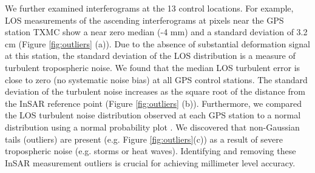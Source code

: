 \documentclass{utexasthesis}
\begin{document}
We further examined interferograms at the 13 control locations. For example, LOS measurements of the ascending interferograms at pixels near the GPS station TXMC show a near zero median (-4 mm) and a standard deviation of 3.2 cm (Figure \ref{fig:outliers} (a)). Due to the absence of substantial deformation signal at this station, the standard deviation of the LOS distribution is a measure of turbulent tropospheric noise.  We found that the median LOS turbulent error is close to zero (no systematic noise bias) at all GPS control stations. The standard deviation of the turbulent noise increases as the square root of the distance from the InSAR reference point (Figure \ref{fig:outliers} (b)). Furthermore, we compared the LOS turbulent noise distribution observed at each GPS station to a normal distribution using a normal probability plot \citep{Filliben1975ProbabilityPlotCorrelation}. We discovered that non-Gaussian tails (outliers) are present (e.g. Figure \ref{fig:outliers}(c)) as a result of severe tropospheric noise (e.g. storms or heat waves). Identifying and removing these InSAR measurement outliers is crucial for achieving millimeter level accuracy. 
\end{document}
